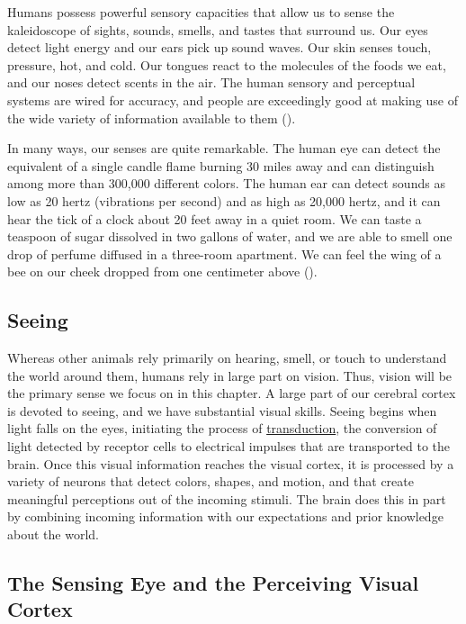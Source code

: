 \documentclass[
]{krantz}
\begin{document}
Humans possess powerful sensory capacities that allow us to sense the kaleidoscope of sights, sounds, smells, and tastes that surround us. Our eyes detect light energy and our ears pick up sound waves. Our skin senses touch, pressure, hot, and cold. Our tongues react to the molecules of the foods we eat, and our noses detect scents in the air. The human sensory and perceptual systems are wired for accuracy, and people are exceedingly good at making use of the wide variety of information available to them ().

In many ways, our senses are quite remarkable. The human eye can detect the equivalent of a single candle flame burning 30 miles away and can distinguish among more than 300,000 different colors. The human ear can detect sounds as low as 20 hertz (vibrations per second) and as high as 20,000 hertz, and it can hear the tick of a clock about 20 feet away in a quiet room. We can taste a teaspoon of sugar dissolved in two gallons of water, and we are able to smell one drop of perfume diffused in a three-room apartment. We can feel the wing of a bee on our cheek dropped from one centimeter above ().

\subsection*{Seeing}\label{seeing}


Whereas other animals rely primarily on hearing, smell, or touch to understand the world around them, humans rely in large part on vision. Thus, vision will be the primary sense we focus on in this chapter. A large part of our cerebral cortex is devoted to seeing, and we have substantial visual skills. Seeing begins when light falls on the eyes, initiating the process of \hyperref[transduction]{transduction}, the conversion of light detected by receptor cells to electrical impulses that are transported to the brain. Once this visual information reaches the visual cortex, it is processed by a variety of neurons that detect colors, shapes, and motion, and that create meaningful perceptions out of the incoming stimuli. The brain does this in part by combining incoming information with our expectations and prior knowledge about the world.

\subsection*{The Sensing Eye and the Perceiving Visual Cortex}\label{the-sensing-eye-and-the-perceiving-visual-cortex}
\end{document}
